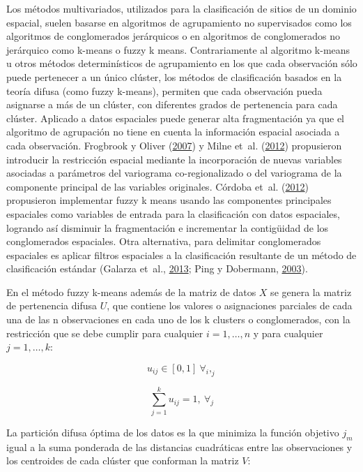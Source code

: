 \documentclass[11pt,b5paper,]{krantz}
\begin{document}
Los métodos multivariados, utilizados para la clasificación de sitios de
un dominio espacial, suelen basarse en algoritmos de agrupamiento no
supervisados como los algoritmos de conglomerados jerárquicos o en
algoritmos de conglomerados no jerárquico como k-means o fuzzy k means.
Contrariamente al algoritmo k-means u otros métodos determinísticos de
agrupamiento en los que cada observación sólo puede pertenecer a un
único clúster, los métodos de clasificación basados en la teoría difusa
(como fuzzy k-means), permiten que cada observación pueda asignarse a
más de un clúster, con diferentes grados de pertenencia para cada
clúster. Aplicado a datos espaciales puede generar alta fragmentación ya
que el algoritmo de agrupación no tiene en cuenta la información
espacial asociada a cada observación. Frogbrook y Oliver
(\protect\hyperlink{ref-Frogbrook_Oliver_2007}{2007}) y Milne et~al.
(\protect\hyperlink{ref-Milne_Webster_Ginsburg_Kindred_2012}{2012})
propusieron introducir la restricción espacial mediante la incorporación
de nuevas variables asociadas a parámetros del variograma
co-regionalizado o del variograma de la componente principal de las
variables originales. Córdoba et~al.
(\protect\hyperlink{ref-Cuxf3rdoba_Balzarini_Bruno_Costa_Balzarini_Costa_2012}{2012})
propusieron implementar fuzzy k means usando las componentes principales
espaciales como variables de entrada para la clasificación con datos
espaciales, logrando así disminuir la fragmentación e incrementar la
contigüidad de los conglomerados espaciales. Otra alternativa, para
delimitar conglomerados espaciales es aplicar filtros espaciales a la
clasificación resultante de un método de clasificación estándar (Galarza
et~al.,
\protect\hyperlink{ref-Galarza_Mastaglia_Albornoz_Martux131nez_2013}{2013};
Ping y Dobermann, \protect\hyperlink{ref-Ping_Dobermann_2003}{2003}).

En el método fuzzy k-means además de la matriz de datos \(X\) se genera
la matriz de pertenencia difusa \(U\), que contiene los valores o
asignaciones parciales de cada una de las n observaciones en cada uno de
los k clusters o conglomerados, con la restricción que se debe cumplir
para cualquier \(i = 1,\ldots,n\) y para cualquier \(j = 1,\ldots,k\):

\[u_{ij}\in[0,1]\ \forall_i,_j\]

\[\sum_{j=1}^{k}{u_{ij}=1,\ \forall_j}\]

La partición difusa óptima de los datos es la que minimiza la función
objetivo \(j_m\) igual a la suma ponderada de las distancias cuadráticas
entre las observaciones y los centroides de cada clúster que conforman
la matriz \(V\):
\end{document}
